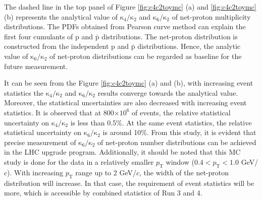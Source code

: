 The dashed line in the top panel of Figure \ref{fig:c4c2toymc} (a) and \ref{fig:c4c2toymc} (b) represents the analytical value of $\mathrm{\kappa}_{4}/\mathrm{\kappa}_{2}$ and $\mathrm{\kappa}_{6}/\mathrm{\kappa}_{2}$ of net-proton multiplicity distributions. The PDFs obtained from Pearson curve method can explain the first four cumulants of p and $\bar{\mathrm{p}}$ distributions. The net-proton distribution is constructed from the independent p and $\bar{\mathrm{p}}$ distributions. Hence, the analytic value of $\mathrm{\kappa}_{6}/\mathrm{\kappa}_{2}$ of net-proton distributions can be regarded as baseline for the future measurement.
\par
It can be seen from the Figure \ref{fig:c4c2toymc} (a) and (b), with increasing event statistics the $\mathrm{\kappa}_{4}/\mathrm {\kappa}_{2}$ and $\mathrm{\kappa}_{6}/\mathrm{\kappa}_{2}$ results converge towards the analytical value. Moreover, the statistical uncertainties are also decreased with increasing event statistics. It is observed that at 800$\times 10^{6}$ of events, the relative statistical uncertainty on $\mathrm{\kappa}_{4}/\mathrm {\kappa}_{2}$ is less than 0.5$\%$. At the same event statistics, the relative statistical uncertainty on $\mathrm{\kappa}_{6}/\mathrm{\kappa}_{2}$ is around 10$\%$. From this study, it is evident that precise measurement of $\mathrm{\kappa}_{6}/\mathrm {\kappa}_{2}$ of net-proton number distributions can be achieved in the LHC upgrade program. Additionally, it should be noted that this MC study is done for the data in a relatively smaller $p_{\mathrm T}$ window ($0.4 < p_{\mathrm T} < 1.0$ GeV/$c$). With increasing $p_{\mathrm T}$ range up to 2 GeV/$c$, the width of the net-proton distribution will increase. In that case, the requirement of event statistics will be more, which is accessible by combined statistics of Run 3 and 4.